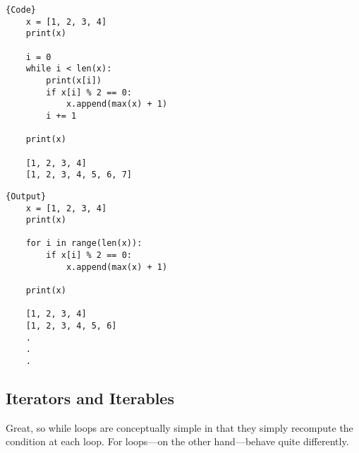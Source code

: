   \noindent\begin{minipage}{.5\textwidth}
  \begin{lstlisting}[]{Code}
    x = [1, 2, 3, 4] 
    print(x)

    i = 0 
    while i < len(x): 
        print(x[i])
        if x[i] % 2 == 0: 
            x.append(max(x) + 1) 
        i += 1

    print(x)

    [1, 2, 3, 4]
    [1, 2, 3, 4, 5, 6, 7] 
  \end{lstlisting}
  \end{minipage}
  \hfill
  \begin{minipage}{.49\textwidth}
  \begin{lstlisting}[]{Output}
    x = [1, 2, 3, 4]
    print(x)

    for i in range(len(x)): 
        if x[i] % 2 == 0: 
            x.append(max(x) + 1) 

    print(x)

    [1, 2, 3, 4]
    [1, 2, 3, 4, 5, 6]
    .
    .
    .
  \end{lstlisting}
  \end{minipage}

\subsection{Iterators and Iterables} 

  Great, so while loops are conceptually simple in that they simply recompute the condition at each loop. For loops---on the other hand---behave quite differently. 

